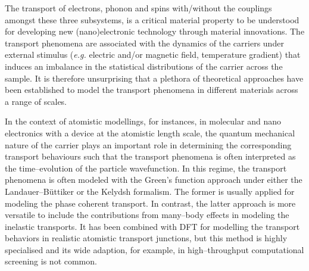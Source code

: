 The transport of electrons, phonon\cite{chen2018manipulation} and spins\cite{zutic2004spintronics,hirohata2020review} with/without the couplings amongst these three subsystems,  is a critical material property to be understood for developing new (nano)electronic technology through material innovations. The transport phenomena are associated with the dynamics of the carriers under external stimulus (\emph{e.g.} electric and/or magnetic field, temperature gradient) that induces an imbalance in the statistical distributions of the carrier across the sample.\cite{onsager1931reciprocal,onsager1931reciprocal2} It is therefore unsurprising that a plethora of theoretical approaches have been established to model the transport phenomena in different materials across a range of scales. 

In the context of atomistic modellings, for instances, in molecular and nano electronics with a device at the atomistic length scale, the quantum mechanical nature of the carrier plays an important role in determining the corresponding transport behaviours such that the transport phenomena is often interpreted as the time--evolution of the particle wavefunction.\cite{economou2006green} In this regime, the transport phenomena is often modeled with the Green's function approach under either the Landauer--B\"{u}ttiker\cite{buttiker1986four}  or the Kelydsh\cite{jauho1994time} formalism. The former is usually applied for modeling the phase coherent transport.\cite{xue2001charge,datta2005quantum} In contrast, the latter approach is more versatile to include the contributions from many--body  effects in modeling the inelastic transports.\cite{lu2007coupled,galperin2006resonant,liu2006inelastic} It has been combined with DFT for modelling the transport behaviors in realistic atomistic transport junctions,\cite{frederiksen2007inelastic,stradi2016general} but this method is highly specialised and its wide adaption, for example, in high--throughput computational screening is not common.

